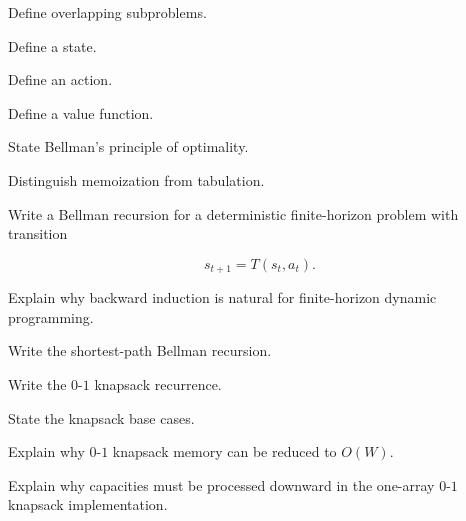 \begin{exercise}[1]
Define overlapping subproblems.
\end{exercise}

\begin{exercise}[1]
Define a state.
\end{exercise}

\begin{exercise}[1]
Define an action.
\end{exercise}

\begin{exercise}[1]
Define a value function.
\end{exercise}

\begin{exercise}[1]
State Bellman's principle of optimality.
\end{exercise}

\begin{exercise}[1]
Distinguish memoization from tabulation.
\end{exercise}

\begin{exercise}[2]
Write a Bellman recursion for a deterministic finite-horizon problem with
transition

\[
s_{t+1}=T(s_t,a_t).
\]
\end{exercise}

\begin{exercise}[2]
Explain why backward induction is natural for finite-horizon dynamic
programming.
\end{exercise}

\begin{exercise}[2]
Write the shortest-path Bellman recursion.
\end{exercise}

\begin{exercise}[2]
Write the \(0\)-\(1\) knapsack recurrence.
\end{exercise}

\begin{exercise}[2]
State the knapsack base cases.
\end{exercise}

\begin{exercise}[2]
Explain why \(0\)-\(1\) knapsack memory can be reduced to \(O(W)\).
\end{exercise}

\begin{exercise}[2]
Explain why capacities must be processed downward in the one-array
\(0\)-\(1\) knapsack implementation.
\end{exercise}

